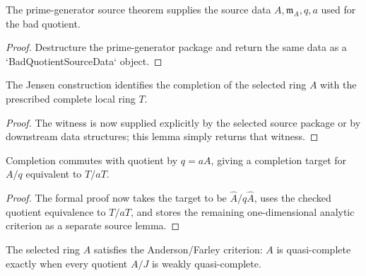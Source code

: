 \begin{lemma}
  \label{lem:bad_quotient_source_data_from_jensen}
  The prime-generator source theorem supplies the source data
  \(A,\mathfrak m_A,q,a\) used for the bad quotient.
\end{lemma}

\begin{proof}
  Destructure the prime-generator package and return the same data as a
  `BadQuotientSourceData` object.
\end{proof}

\begin{lemma}
  \label{lem:jensen_completion_witness_source}
  The Jensen construction identifies the completion of the selected ring
  \(A\) with the prescribed complete local ring \(T\).
\end{lemma}

\begin{proof}
  The witness is now supplied explicitly by the selected source package or by
  downstream data structures; this lemma simply returns that witness.
\end{proof}

\begin{lemma}
  \label{lem:quotient_completion_witness_source}
  Completion commutes with quotient by \(q=aA\), giving a completion target for
  \(A/q\) equivalent to \(T/aT\).
\end{lemma}

\begin{proof}
  The formal proof now takes the target to be
  \(\widehat A/q\widehat A\), uses the checked quotient equivalence to
  \(T/aT\), and stores the remaining one-dimensional analytic criterion as a
  separate source lemma.
\end{proof}

\begin{lemma}
  \label{lem:bad_quotient_quasi_criterion_source}
  The selected ring \(A\) satisfies the Anderson/Farley criterion:
  \(A\) is quasi-complete exactly when every quotient \(A/J\) is weakly
  quasi-complete.
\end{lemma}

